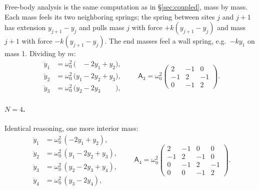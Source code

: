 \documentclass[11pt]{article}
\theoremstyle{plain}
\theoremstyle{definition}
\theoremstyle{remark}
\newcommand{\mA}{\mathsf{A}}
\begin{document}
Free-body analysis is the same computation as in \S\ref{sec:coupled}, mass by
mass. Each mass feels its two neighboring springs; the spring between sites
$j$ and $j+1$ has extension $y_{j+1}-y_j$ and pulls mass $j$ with force
$+k(y_{j+1}-y_j)$ and mass $j+1$ with force $-k(y_{j+1}-y_j)$. The end masses
feel a wall spring, e.g.\ $-ky_1$ on mass 1. Dividing by $m$:
\begin{equation}
  \begin{aligned}
  \ddot y_1 &= \omega_0^2\,\bigl(\phantom{y_0} -2y_1 + y_2\bigr),\\
  \ddot y_2 &= \omega_0^2\,\bigl(y_1 - 2y_2 + y_3\bigr),\\
  \ddot y_3 &= \omega_0^2\,\bigl(y_2 - 2y_3 \phantom{{}+y_4}\bigr),
  \end{aligned}
  \qquad
  \mA_3 = \omega_0^2
  \begin{pmatrix}
    2 & -1 & 0\\
    -1 & 2 & -1\\
    0 & -1 & 2
  \end{pmatrix}.
\end{equation}

\paragraph{$N=4$.}
Identical reasoning, one more interior mass:
\begin{equation}
  \begin{aligned}
  \ddot y_1 &= \omega_0^2\,(-2y_1 + y_2),\\
  \ddot y_2 &= \omega_0^2\,(y_1 - 2y_2 + y_3),\\
  \ddot y_3 &= \omega_0^2\,(y_2 - 2y_3 + y_4),\\
  \ddot y_4 &= \omega_0^2\,(y_3 - 2y_4),
  \end{aligned}
  \qquad
  \mA_4 = \omega_0^2
  \begin{pmatrix}
    2 & -1 & 0 & 0\\
    -1 & 2 & -1 & 0\\
    0 & -1 & 2 & -1\\
    0 & 0 & -1 & 2
  \end{pmatrix}.
\end{equation}
\end{document}
